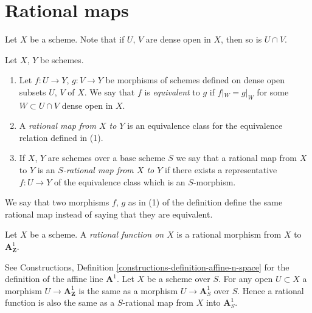 \section{Rational maps}
\label{section-rational-maps}

\noindent
Let $X$ be a scheme. Note that if $U$, $V$ are dense open
in $X$, then so is $U \cap V$.

\begin{definition}
\label{definition-rational-map}
Let $X$, $Y$ be schemes.
\begin{enumerate}
\item Let $f : U \to Y$, $g : V \to Y$ be morphisms of schemes defined
on dense open subsets $U$, $V$ of $X$. We say that $f$ is
{\it equivalent} to $g$ if $f|_W = g|_W$ for some $W \subset U \cap V$
dense open in $X$.
\item A {\it rational map from $X$ to $Y$}
is an equivalence class for the equivalence relation defined in (1).
\item If $X$, $Y$ are schemes over a base scheme $S$ we say that
a rational map from $X$ to $Y$ is an {\it $S$-rational map from $X$
to $Y$} if there exists a representative $f : U \to Y$ of the equivalence
class which is an $S$-morphism.
\end{enumerate}
\end{definition}

\noindent
We say that two morphisms $f$, $g$ as in (1) of the definition
define the same rational map instead of saying that they are equivalent.

\begin{definition}
\label{definition-rational-function}
Let $X$ be a scheme. A {\it rational function on $X$} is a rational morphism
from $X$ to $\mathbf{A}^1_{\mathbf{Z}}$.
\end{definition}

\noindent
See Constructions, Definition \ref{constructions-definition-affine-n-space}
for the definition of the affine line $\mathbf{A}^1$. Let $X$ be a scheme
over $S$. For any open $U \subset X$ a morphism
$U \to \mathbf{A}^1_{\mathbf{Z}}$ is the same as a morphism
$U \to \mathbf{A}^1_S$ over $S$. Hence a rational function is
also the same as a $S$-rational map from $X$ into $\mathbf{A}^1_S$.

